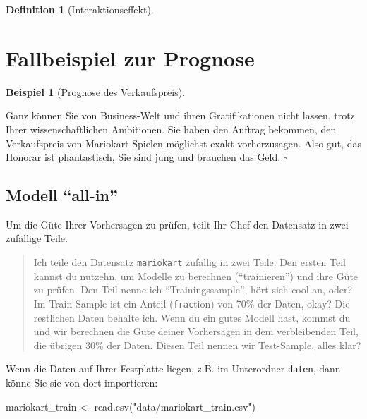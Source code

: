 \documentclass[
  letterpaper,
]{scrbook}
\newenvironment{Shaded}{\begin{snugshade}}{\end{snugshade}}
\newcommand{\FunctionTok}[1]{\textcolor[rgb]{0.28,0.35,0.67}{#1}}
\newcommand{\NormalTok}[1]{\textcolor[rgb]{0.00,0.23,0.31}{#1}}
\newcommand{\OtherTok}[1]{\textcolor[rgb]{0.00,0.23,0.31}{#1}}
\newcommand{\StringTok}[1]{\textcolor[rgb]{0.13,0.47,0.30}{#1}}
\theoremstyle{definition}
\theoremstyle{definition}
\newtheorem{example}{Beispiel}[chapter]
\theoremstyle{definition}
\newtheorem{definition}{Definition}[chapter]
\theoremstyle{remark}
\begin{document}
\begin{definition}[Interaktionseffekt]
\section{Fallbeispiel zur Prognose}\label{fallbeispiel-zur-prognose}

\begin{example}[Prognose des
Verkaufspreis]\protect\hypertarget{exm-prognose}{}\label{exm-prognose}

Ganz können Sie von Business-Welt und ihren Gratifikationen nicht
lassen, trotz Ihrer wissenschaftlichen Ambitionen. Sie haben den Auftrag
bekommen, den Verkaufspreis von Mariokart-Spielen möglichst exakt
vorherzusagen. Also gut, das Honorar ist phantastisch, Sie sind jung und
brauchen das Geld. \(\square\)

\end{example}

\subsection{\texorpdfstring{Modell
\enquote{all-in}}{Modell ``all-in''}}\label{modell-all-in}

Um die Güte Ihrer Vorhersagen zu prüfen, teilt Ihr Chef den Datensatz in
zwei zufällige Teile.

\begin{quote}
{} Ich teile den Datensatz \texttt{mariokart} zufällig in
zwei Teile. Den ersten Teil kannst du nutzehn, um Modelle zu berechnen
(\enquote{trainieren}) und ihre Güte zu prüfen. Den Teil nenne ich
\enquote{Trainingssample}, hört sich cool an, oder? Im Train-Sample ist
ein Anteil (\texttt{frac}tion) von 70\% der Daten, okay? Die restlichen
Daten behalte ich. Wenn du ein gutes Modell hast, kommst du und wir
berechnen die Güte deiner Vorhersagen in dem verbleibenden Teil, die
übrigen 30\% der Daten. Diesen Teil nennen wir Test-Sample, alles klar?
\end{quote}

Wenn die Daten auf Ihrer Festplatte liegen, z.B. im Unterordner
\texttt{daten}, dann könne Sie sie von dort importieren:

\begin{Shaded}
\begin{Highlighting}[]
\NormalTok{mariokart\_train }\OtherTok{\textless{}{-}} \FunctionTok{read.csv}\NormalTok{(}\StringTok{"data/mariokart\_train.csv"}\NormalTok{)}
\end{Highlighting}
\end{Shaded}


\end{definition}
\end{document}
